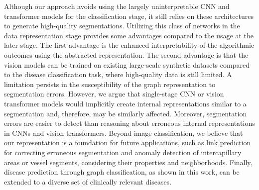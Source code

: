 Although our approach avoids using the largely uninterpretable CNN and transformer models for the classification stage, it still relies on these architectures to generate high-quality segmentations. Utilizing this class of networks in the data representation stage provides some advantages compared to the usage at the later stage. The first advantage is the enhanced interpretability of the algorithmic outcomes using the abstracted representation. The second advantage is that the vision models can be trained on existing large-scale synthetic datasets \cite{kreitner2023detailed} compared to the disease classification task, where high-quality data is still limited. A limitation persists in the susceptibility of the graph representation to segmentation errors. However, we argue that single-stage CNN or vision transformer models would implicitly create internal representations similar to a segmentation and, therefore, may be similarly affected. Moreover, segmentation errors are easier to detect than reasoning about erroneous internal representations in CNNs and vision transformers. 
Beyond image classification, we believe that our representation is a foundation for future applications, such as link prediction for correcting erroneous segmentation and anomaly detection of intercapillary areas or vessel segments, considering their properties and neighborhoods. Finally, disease prediction through graph classification, as shown in this work, can be extended to a diverse set of clinically relevant diseases. 
